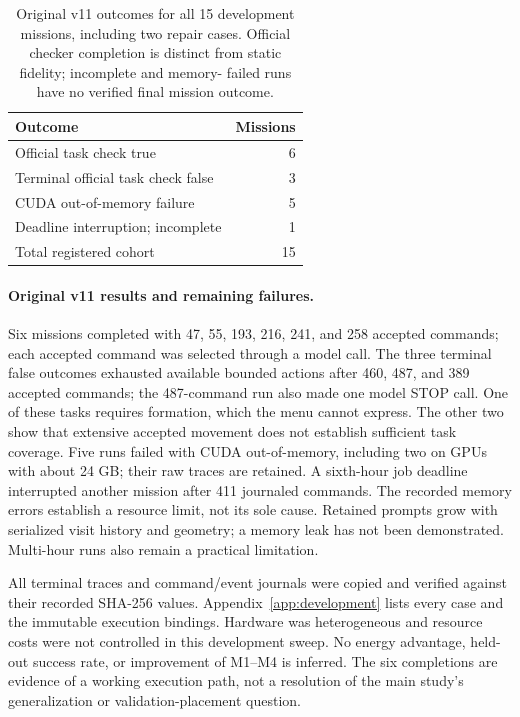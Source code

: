 \documentclass{article}
\begin{document}
\begin{table}[t]
  \centering
  \caption{Original v11 outcomes for all 15 development missions, including two repair cases. Official
  checker completion is distinct from static fidelity; incomplete and memory-
  failed runs have no verified final mission outcome.}
  \label{tab:development}
  \begin{tabular}{@{}lr@{}}
    \toprule
    Outcome & Missions \\
    \midrule
    Official task check true & 6 \\
    Terminal official task check false & 3 \\
    CUDA out-of-memory failure & 5 \\
    Deadline interruption; incomplete & 1 \\
    \midrule
    Total registered cohort & 15 \\
    \bottomrule
  \end{tabular}
\end{table}

\paragraph{Original v11 results and remaining failures.}
Six missions completed with 47, 55, 193, 216, 241, and 258 accepted commands;
each accepted command was selected through a model call. The three terminal
false outcomes exhausted available bounded actions after 460, 487, and 389
accepted commands; the 487-command run also made one model STOP call. One of
these tasks requires formation, which the menu cannot express. The other two
show that extensive accepted movement does not establish sufficient task
coverage. Five runs failed with CUDA out-of-memory, including two on GPUs with
about 24 GB; their raw traces are retained. A sixth-hour job deadline interrupted
another mission after 411 journaled commands. The recorded memory errors
establish a resource limit, not its sole cause. Retained prompts grow with
serialized visit history and geometry; a memory leak has not been demonstrated.
Multi-hour runs also remain a practical limitation.

All terminal traces and command/event journals were copied and verified against
their recorded SHA-256 values. Appendix~\ref{app:development} lists every case
and the immutable execution bindings. Hardware was heterogeneous and resource
costs were not controlled in this development sweep. No energy advantage,
held-out success rate, or improvement of M1--M4 is inferred. The six completions
are evidence of a working execution path, not a resolution of the main study's
generalization or validation-placement question.
\end{document}
